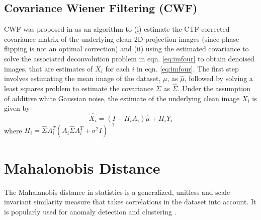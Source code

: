\documentclass{article}
\begin{document}
\subsection{Covariance Wiener Filtering (CWF)}
CWF was proposed in \cite{cwf} as an algorithm to (i) estimate the CTF-corrected covariance matrix of the underlying clean 2D projection images (since phase flipping is not an optimal correction)  and (ii) using the estimated covariance to solve the associated deconvolution problem in eqn. \ref{eq:imfour} to obtain denoised images, that are estimates of $X_i$ for each $i$ in 
eqn. \ref{eq:imfour}. The first step involves estimating the mean image of the dataset, $\mu$, as $\hat{\mu}$, followed by solving a least squares problem to estimate the covariance $\Sigma$ as $\hat{\Sigma}$. Under the assumption of additive white Gaussian noise, the estimate of the underlying clean image $X_i$ is given by
\begin{equation}
\hat{X_i}=(I-H_iA_i)\hat{\mu} + H_iY_i
\end{equation}
where $H_i=\hat{\Sigma}A_i^T(A_i \hat{\Sigma}A_i^T + \sigma^2 I)^{-1}$
%
\section{Mahalonobis Distance}
The Mahalanobis distance in statistics \cite{mah} is a generalized, unitless and scale invariant similarity measure that takes correlations in the dataset into account. It is popularly used for anomaly detection and clustering \cite{mahclust1, mahclust2}.
 
\end{document}
